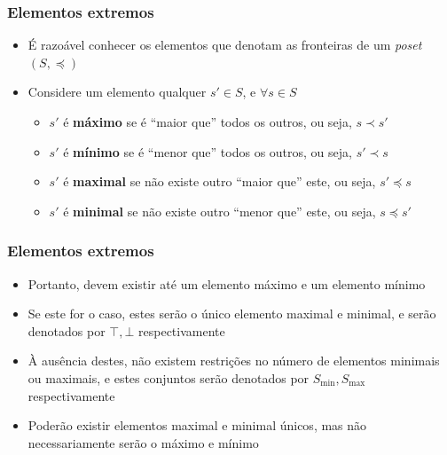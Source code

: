 \documentclass[12pt]{beamer}
\begin{document}
\begin{frame}
  \frametitle{Elementos extremos}
  \begin{itemize}
    \item É razoável conhecer os elementos que denotam as fronteiras de um
        \emph{poset} $(S, \preccurlyeq)$
    \item Considere um elemento qualquer $s' \in S$, e $\forall s \in S$
    \begin{itemize}[itemsep=0pt]
      \item $s'$ é \textbf{máximo} se é ``maior que'' todos os outros, ou seja,
          $s \prec s'$
      \item $s'$ é \textbf{mínimo} se é ``menor que'' todos os outros, ou seja,
          $s' \prec s$
      \item $s'$ é \textbf{maximal} se não existe outro ``maior que'' este, ou
          seja, $s' \preccurlyeq s$
      \item $s'$ é \textbf{minimal} se não existe outro ``menor que'' este, ou
          seja, $s \preccurlyeq s'$
    \end{itemize}
  \end{itemize}
\end{frame}

\begin{frame}
  \frametitle{Elementos extremos}
  \begin{itemize}
    \item Portanto, devem existir até um elemento máximo e um elemento mínimo
    \item Se este for o caso, estes serão o único elemento maximal e minimal, e
        serão denotados por $\top, \bot$ respectivamente
    \item À ausência destes, não existem restrições no número de elementos
        minimais ou maximais, e estes conjuntos serão denotados por $S_{\min},
          S_{\max}$ respectivamente
    \item Poderão existir elementos maximal e minimal únicos, mas não
        necessariamente serão o máximo e mínimo
  \end{itemize}
\end{frame}
\end{document}
